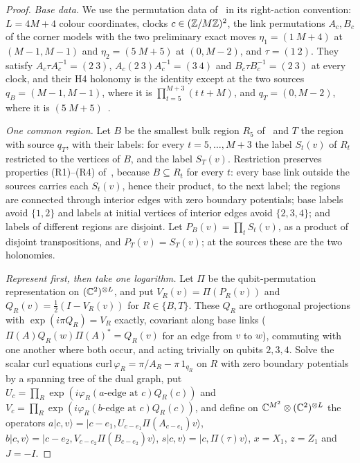 \begin{proof}
\emph{Base data.} We use the permutation data of~\cite[\S6]{DM-H3} in its right-action convention: $L=4M+4$ colour coordinates,
clocks $c\in(\mathbb Z/M\mathbb Z)^2$, the link permutations $A_c,B_c$ of the corner models with the two preliminary exact moves
$\eta_1=(1\ M{+}4)$ at $(M-1,M-1)$ and $\eta_2=(5\ M{+}5)$ at $(0,M-2)$, and $\tau=(1\ 2)$. They satisfy $A_c\tau A_c^{-1}=(2\ 3)$,
$A_c(2\ 3)A_c^{-1}=(3\ 4)$ and $B_c\tau B_c^{-1}=(2\ 3)$ at every clock, and their H4 holonomy is the identity except at the two
sources $q_B=(M-1,M-1)$, where it is $\prod_{t=5}^{M+3}(t\ t{+}M)$, and $q_T=(0,M-2)$, where it is $(5\ M{+}5)$~\cite[proofs of
Propositions~6.1 and~6.5]{DM-H3}.

\emph{One common region.} Let $B$ be the smallest bulk region $R_5$ of~\cite[proof of Proposition~6.5]{DM-H3} and $T$ the region with
source $q_T$, with their labels: for every $t=5,\dots,M+3$ the label $S_t(v)$ of $R_t$ restricted to the vertices of $B$, and the
label $S_T(v)$. Restriction preserves properties (R1)--(R4) of~\cite[Lemma~6.4]{DM-H3}, because $B\subseteq R_t$ for every $t$: every
base link outside the sources carries each $S_t(v)$, hence their product, to the next label; the regions are connected through
interior edges with zero boundary potentials; base labels avoid $\{1,2\}$ and labels at initial vertices of interior edges avoid
$\{2,3,4\}$; and labels of different regions are disjoint. Let $P_B(v)=\prod_tS_t(v)$, as a product of disjoint transpositions, and
$P_T(v)=S_T(v)$; at the sources these are the two holonomies.

\emph{Represent first, then take one logarithm.} Let $\Pi$ be the qubit-permutation representation on $(\mathbb C^2)^{\otimes L}$, and put
$V_R(v)=\Pi(P_R(v))$ and $Q_R(v)=\frac12(I-V_R(v))$ for $R\in\{B,T\}$. These $Q_R$ are orthogonal projections with
$\exp(i\pi Q_R)=V_R$ exactly, covariant along base links ($\Pi(A)Q_R(w)\Pi(A)^*=Q_R(v)$ for an edge from $v$ to $w$), commuting with
one another where both occur, and acting trivially on qubits $2,3,4$. Solve the scalar curl equations
$\mathrm{curl}\,\varphi_R=\pi/A_R-\pi\,1_{q_R}$ on $R$ with zero boundary potentials by a spanning tree of the dual graph, put
$U_c=\prod_R\exp(i\varphi_R(\text{$a$-edge at }c)Q_R(c))$ and $V_c=\prod_R\exp(i\varphi_R(\text{$b$-edge at }c)Q_R(c))$, and define on
$\mathbb C^{M^2}\otimes(\mathbb C^2)^{\otimes L}$ the operators $a|c,v\rangle=|c-e_1,U_{c-e_1}\Pi(A_{c-e_1})v\rangle$,
$b|c,v\rangle=|c-e_2,V_{c-e_2}\Pi(B_{c-e_2})v\rangle$, $s|c,v\rangle=|c,\Pi(\tau)v\rangle$, $x=X_1$, $z=Z_1$ and $J=-I$.


\end{proof}

